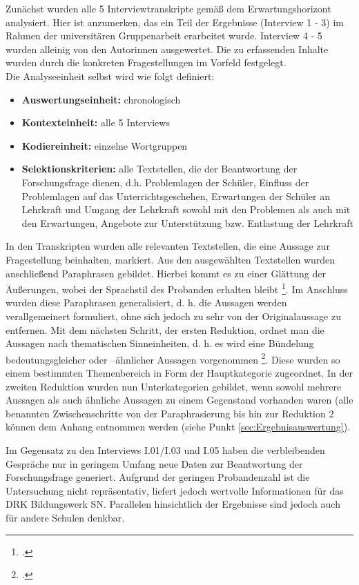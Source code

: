Zunächst wurden alle 5 Interviewtranskripte gemäß dem Erwartungshorizont analysiert. Hier ist anzumerken, das ein Teil der Ergebnisse (Interview 1 - 3) im Rahmen der universitären Gruppenarbeit erarbeitet wurde. Interview 4 - 5 wurden alleinig von den Autorinnen ausgewertet. Die zu erfassenden Inhalte wurden durch die konkreten  Fragestellungen im Vorfeld festgelegt.\\

\noindent
Die Analyseeinheit selbst wird wie folgt definiert:

\begin{itemize}
	\item \textbf{Auswertungseinheit:} chronologisch
	\item \textbf{Kontexteinheit:} alle 5 Interviews
	\item \textbf{Kodiereinheit:} einzelne Wortgruppen
	\item \textbf{Selektionskriterien:} alle Textstellen, die der Beantwortung der Forschungsfrage dienen, d.h. Problemlagen der Schüler, Einfluss der Problemlagen auf das Unterrichtsgeschehen, Erwartungen der Schüler an Lehrkraft und Umgang der Lehrkraft sowohl mit den Problemen als auch mit den Erwartungen, Angebote zur Unterstützung bzw. Entlastung der Lehrkraft
\end{itemize}

\noindent
In den Transkripten wurden alle relevanten Textstellen, die eine Aussage zur Fragestellung beinhalten, markiert. Aus den ausgewählten Textstellen wurden anschließend Paraphrasen gebildet. Hierbei kommt es zu einer Glättung der Äußerungen, wobei der Sprachstil des Probanden erhalten bleibt \footcite[vgl.][138]{Krueger2014}. Im Anschluss wurden diese Paraphrasen generalisiert, d. h. die Aussagen werden verallgemeinert formuliert, ohne sich jedoch zu sehr von der Originalaussage zu entfernen. Mit dem nächsten Schritt, der ersten Reduktion, ordnet man die Aussagen nach thematischen Sinneinheiten, d. h. es wird eine Bündelung bedeutungsgleicher oder --ähnlicher Aussagen vorgenommen \footcite[vgl.][139]{Krueger2014}. Diese wurden so einem bestimmten Themenbereich in Form der Hauptkategorie zugeordnet. In der zweiten Reduktion wurden nun Unterkategorien gebildet, wenn sowohl mehrere Aussagen als auch ähnliche Aussagen zu einem Gegenstand vorhanden waren (alle benannten Zwischenschritte von der Paraphrasierung bis hin zur Reduktion 2 können dem Anhang entnommen werden (siehe Punkt \ref{sec:Ergebnisauswertung}).

Im Gegensatz zu den Interviews I.01/I.03 und I.05 haben die verbleibenden Gespräche nur in geringem Umfang neue Daten zur Beantwortung der Forschungsfrage generiert. Aufgrund der geringen Probandenzahl ist die Untersuchung nicht repräsentativ, liefert jedoch wertvolle Informationen für das DRK Bildungswerk SN. Parallelen hinsichtlich der Ergebnisse sind jedoch auch für andere Schulen denkbar.
